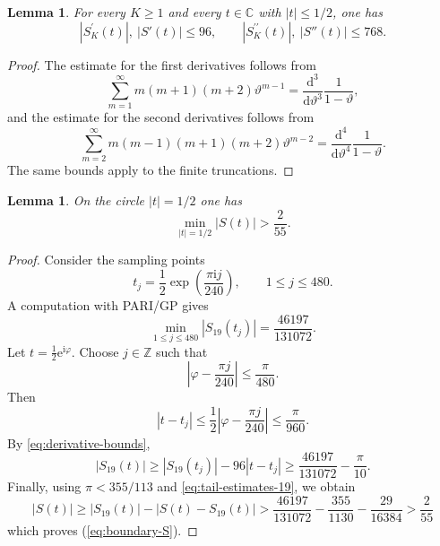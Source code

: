 \documentclass[11pt,reqno]{amsart}
\theoremstyle{plain}
\newtheorem{lemma}[theorem]{Lemma}
\theoremstyle{remark}
\theoremstyle{definition}
\numberwithin{equation}{section}
\newcommand{\zerlegung}{K}
\begin{document}
\begin{lemma}\label{lem:derivative-bounds}
For every $\zerlegung
\geq 1$ and every $t\in\mathbb C$ with $|t|\leq 1/2$, one has
\begin{equation}\label{eq:derivative-bounds}
        \left| S_{\zerlegung }^{\prime }\left( t\right)
        \right| ,\ |S'(t)|\leq 96,
        \qquad
        \left| S_{\zerlegung }^{\prime \prime }
        \left( t\right) \right| ,\ |S''(t)|\leq 768.
\end{equation}
\end{lemma}

\begin{proof}
The estimate for the first derivatives follows from
\[
 \sum_{m=1}^{\infty}m(m+1)(m+2)\vartheta
 ^{m-1}=
 \frac{\mathrm{d}^{3}}{\mathrm{d}\vartheta
 ^{3}}\frac{1}{1-\vartheta
 },
\]
and the estimate for the second derivatives follows from
\[
 \sum_{m=2}^{\infty}m(m-1)(m+1)(m+2)\vartheta
 ^{m-2}=
 \frac{\mathrm{d}^{4}}{\mathrm{d}\vartheta
 ^{4}}\frac{1}{1-\vartheta
 }.
\]
The same bounds apply to the finite truncations.
\end{proof}

\begin{lemma}\label{lem:boundary}
On the circle $|t|=1/2$ one has
\begin{equation}\label{eq:boundary-S}
        \min_{|t|=1/2}|S(t)|>\frac{2}{55}.
\end{equation}
\end{lemma}

\begin{proof}
Consider the sampling points
\[
        t_j=\frac12\exp\left(\frac{\pi \mathrm{i} j}{24
0}\right),
        \qquad 1\leq j
\leq 480
.
\]
A
computation with PARI/GP gives
\[
        \min_{1
        \leq j
\leq 480
}|S_{19}(t_j)|=\frac{46197}{131072}.
\]
Let $t=\frac12 \mathrm{e}^{\mathrm{i}
\varphi }$. Choose $j\in \mathbb{Z}$
such that
\[
        \left|\varphi -\frac{\pi j}{24
0}\right|\leq \frac{\pi}{48
0}.
\]
Then
\[
        |t-t_j|\leq \frac12\left|\varphi -\frac{\pi j}{24
0}\right|
        \leq \frac{\pi}{96
0}.
\]
By \eqref{eq:derivative-bounds},
\[
        |S_{19}(t)|\geq |S_{19}(t_j)|-96|t-t_j|
        \geq \frac{46197}{131072}-\frac{\pi}{1
0}.
\]
Finally,
using $\pi<355/113$ and \eqref{eq:tail-estimates-19}, we obtain
\[
        |S(t)|\geq |S_{19}(t)|-|S(t)-S_{19}(t)|>
        \frac{46197}{131072}-\frac{355
}{1130
}-\frac{29}{16384}
        >
\frac{2
}{55
}
\]
which proves (\ref{eq:boundary-S}).
\end{proof}
\end{document}
